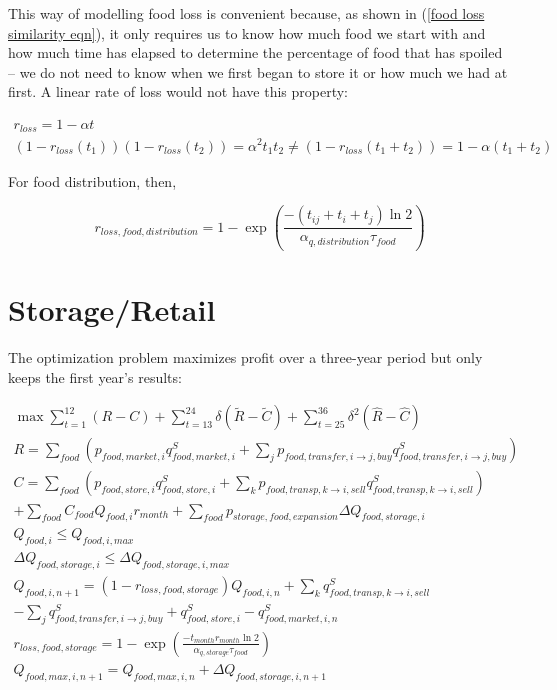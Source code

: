 \documentclass[letter,12pt]{article}
\begin{document}
This way of modelling food loss is convenient because, as shown in (\ref{food loss similarity eqn}), it only requires us to know how much food we start with and how much time has elapsed to determine the percentage of food that has spoiled -- we do not need to know when we first began to store it or how much we had at first.  A linear rate of loss would not have this property:

\begin{align}
r_{loss} = 1 - \alpha t \\
\left(1-r_{loss}\left(t_1\right)\right)\left(1-r_{loss}\left(t_2\right)\right) = \alpha^2 t_1 t_2 \neq \left(1-r_{loss}\left(t_1+t_2\right)\right) = 1 - \alpha \left(t_1 + t_2\right)
\end{align}

For food distribution, then, 

\begin{equation}
r_{loss,food,distribution} = 1 - \exp \left( \frac{- \left(t_{ij} + t_i + t_j\right) \ln 2}{\alpha_{q,distribution} \tau_{food}}\right)
\end{equation}


\section{Storage/Retail}

The optimization problem maximizes profit over a three-year period but only keeps the first year's results:

\begin{gather}
\max \sum_{t=1}^{12} \left(R - C\right) + \sum_{t=13}^{24} \delta \left(\tilde{R} - \tilde{C}\right) + \sum_{t=25}^{36} \delta^2 \left(\hat{R} - \hat{C}\right) \\
R = \sum_{food} \left(p_{food,market,i} q_{food,market,i}^S + \sum_j p_{food,transfer,i \rightarrow j,buy} q_{food,transfer,i \rightarrow j,buy}^S \right) \\
C = \sum_{food} \left( p_{food,store,i} q_{food,store,i}^S + \sum_k p_{food,transp,k \rightarrow i,sell} q_{food,transp,k \rightarrow i,sell}^S \right) \nonumber \\
+ \sum_{food} C_{food} Q_{food,i} r_{month} + \sum_{food} p_{storage,food,expansion} \Delta Q_{food,storage,i} \\
Q_{food,i} \leq Q_{food,i,max} \label{storage capacity con} \\
\Delta Q_{food,storage,i} \leq \Delta Q_{food,storage,i,max} \label{storage exp con}\\
Q_{food,i,n+1} = \left(1-r_{loss,food,storage}\right) Q_{food,i,n} + \sum_k q_{food,transp,k \rightarrow i,sell}^S \nonumber \\
- \sum_j q_{food,transfer,i \rightarrow j,buy}^S + q_{food,store,i}^S - q_{food,market,i,n}^S \label{storage quantity eqn} \\
r_{loss,food,storage} = 1 - \exp \left( \frac{- t_{month} r_{month} \ln 2}{\alpha_{q,storage} \tau_{food}}\right) \label{storage loss eqn}\\
Q_{food,max,i,n+1} = Q_{food,max,i,n} + \Delta Q_{food,storage,i,n+1} \label{storage capacity eqn}
\end{gather}
\end{document}
